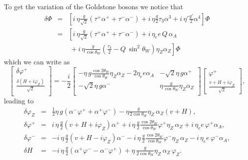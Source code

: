 \documentclass{ws-ijmpa}
\begin{document}
%
To get the variation of the Goldstone bosons we notice that 
%
\begin{eqnarray}
\delta \Phi
&=&
\left[  i\, \eta \frac{ g}{\sqrt{2}} \left(
 \tau^+ \alpha^+ +  \tau^- \alpha^- \right) 
+i\, \eta \frac{g}{2} \tau_3 \alpha^3
+ i\, \eta' \frac{g'}{2} \alpha^4 \right] \Phi
\\[+2mm]
&=&
\left[  i\,\eta \frac{g}{\sqrt{2}} \left(
 \tau^+ \alpha^+ +  \tau^- \alpha^- \right) +i\, \eta_e e\, Q\,   \alpha_A
\right.
\nonumber\\
&&
\ \ 
\left.
+\ i\,\eta \frac{g}{\cos\theta_W} \left(\frac{\tau_3}{2} - Q\, \sin^2\theta_W
\right)\eta_Z \alpha_Z \right] \Phi
 \label{eq:1}
\end{eqnarray}
%
which we can write as
%
\begin{equation}
  \label{eq:2}
  \begin{bmatrix}
    \delta\varphi^+\\[+2mm]
\displaystyle
    \frac{\delta(H + i \varphi_Z)}{\sqrt{2}}\\ 
  \end{bmatrix}
=-\frac{i}{2}
\begin{bmatrix}
\displaystyle
  -\eta\,g \tfrac{\cos2\theta_W}{\cos\theta_W} \eta_Z \alpha_Z -2
  \eta_e e \alpha_A &
  -\sqrt{2} \eta\, g \alpha^+ \\[+2mm]
\displaystyle
 -\sqrt{2} \eta\, g \alpha^- & \eta \tfrac{g}{\cos\theta_W} \eta_Z
 \alpha_Z \\
\end{bmatrix}
\begin{bmatrix}
  \varphi^+\\[+2mm]
\displaystyle
 \frac{v + H + i \varphi_Z}{\sqrt{2}}
\end{bmatrix} ,
\end{equation}
%
leading to
%
\begin{eqnarray}
\delta\varphi_Z
&=&
\displaystyle
  \frac{1}{2}\eta\, g \left(\alpha^- \varphi^+ +
\alpha^+ \varphi^- \right) -\eta \frac{g}{2 \cos\theta_W}\eta_Z\,
 \alpha_Z (v + H) ,
\nonumber\\[+2mm]
\delta \varphi^+
&=&
\displaystyle
i\,\eta\, \frac{g}{2} (v + H + i \varphi_Z) \alpha^+ 
+ i\,\eta\, \frac{g}{2}  \frac{\cos 2\theta_W}{\cos\theta_W} \varphi^+
\eta_Z\, \alpha_Z
+ i\, \eta_e e\, \varphi^+ \alpha_A ,
\nonumber\\[+2mm]
\delta \varphi^-
&=&
\displaystyle
 -i\,\eta\, \frac{g}{2} (v + H - i \varphi_Z) \alpha^- 
- i\,\eta\, \frac{g}{2}  \frac{\cos 2\theta_W}{\cos\theta_W} \varphi^-
\eta_Z\, \alpha_Z - i\,\eta_e  e\, \varphi^- \alpha_A ,
\nonumber\\[+2mm]
\delta H
&=& 
-i\,\eta\, \frac{g}{2} ( \alpha^+ \varphi^- - \alpha^- \varphi^+)  
+ \eta\, \frac{g}{2\cos\theta_W} \eta_Z\, \alpha_Z\, \varphi_Z .
\label{eq:112}
\end{eqnarray}
\end{document}
